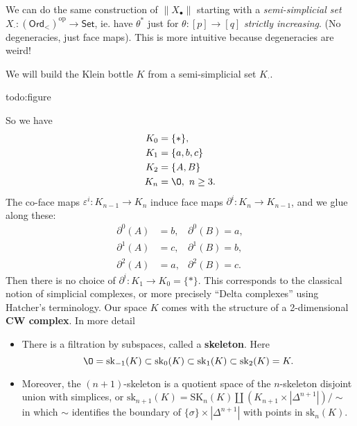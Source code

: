 \begin{remark}
    We can do the same construction of $\|X_{\bullet}\|$ starting with a \emph{semi-simplicial set} $X _{\cdot } \colon \left( \mathsf{Ord} _< \right)  ^{\mathrm{op}}\to \mathsf{Set} $, ie. have $\theta^*$ just for $\theta \colon [p] \to [q]$ \emph{strictly increasing}. (No degeneracies, just face maps). This is more intuitive because degeneracies are weird!
\end{remark}
\begin{example}
   We will build the Klein bottle $K$ from a semi-simplicial set $K_{\cdot }$. 

   {\color{red}todo:figure} 

   So we have 
   \begin{align*}
       K_0&=\{*\},\\
       K_1&=\{a,b,c\} \\
       K_2&=\{A,B\} \\
       K_n &=\O, \ n\geq 3.
   \end{align*}
   The co-face maps $\varepsilon ^i \colon K_{n-1} \to K_n$ induce face maps $\partial ^i  \colon K_n  \to K_{n-1}$, and we glue along these: 
   \begin{align*}
       \partial ^0(A)&=b,&\partial ^0(B)=a,\\
       \partial ^1(A)&=c,&\partial ^1(B)=b,\\
       \partial ^2(A)&=a,&\partial ^2(B)=c.
   \end{align*}
   Then there is no choice of $\partial ^i  \colon K_1 \to K_0=\{*\} $. This corresponds to the classical notion of simplicial complexes, or more precisely ``Delta complexes'' using Hatcher's terminology. Our space $K$ comes with the structure of a 2-dimensional  \textbf{CW complex}. In more detail
   \begin{itemize}
   \setlength\itemsep{-.2em}
       \item There is a filtration by subspaces, called a \textbf{skeleton}. Here \[
               \O = \mathrm{sk}_{-1}(K)\subset \mathrm{sk}_0(K) \subset \mathrm{sk}_1(K) \subset \mathrm{sk}_2(K)=K.
       \] 
   \item Moreover, the $(n+1)$-skeleton is a quotient space of the $n$-skeleton disjoint union with simplices, or $\mathrm{sk}_{n+1}(K)= \mathrm{SK}_n (K) \amalg \left( K_{n+1}\times |\Delta ^{n+1}| \right) /\sim$ in which $\sim$ identifies the boundary of $\{\sigma\} \times |\Delta ^{n+1}|$ with points in $\mathrm{sk}_n (K)$.
   \end{itemize}
\end{example}
